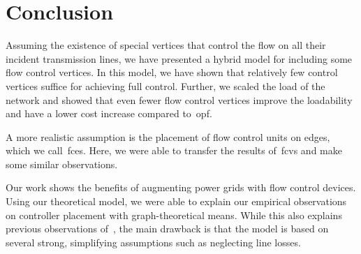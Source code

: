 \section{Conclusion}    
\label{facts:sec:conclusion}
%
Assuming the existence of special vertices that control the flow on all their
incident transmission lines, we have presented a hybrid model for including some
flow control vertices.  In this model, we have shown that relatively few control
vertices suffice for achieving full control. Further, we scaled the load of the
network and showed that even fewer flow control vertices improve the loadability
and have a lower cost increase compared to~\gls{opf}. 

A more realistic assumption is the placement of flow control units on edges,
which we call~\gls{fce}s. Here, we were able to transfer the results of~\gls{fcv}s and
make some similar observations.

Our work shows the benefits of augmenting power grids with flow control devices.
Using our theoretical model, we were able to explain our empirical observations
on controller placement with graph-theoretical means. While this also explains
previous observations of~\textcite{gcg-olmtf-01}, the main drawback is that the
model is based on several strong, simplifying assumptions such as neglecting
line losses.

%